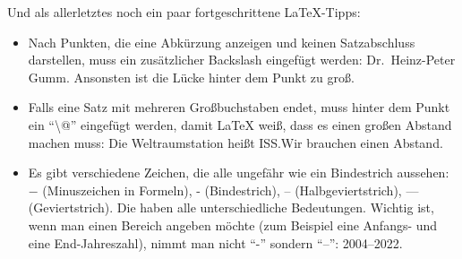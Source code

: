 \documentclass{dsadokumentation}
\begin{document}
Und als allerletztes noch ein paar fortgeschrittene \LaTeX{}-Tipps:
\begin{itemize}
	\item Nach Punkten, die eine Abkürzung anzeigen und keinen Satzabschluss darstellen, muss ein zusätzlicher Backslash eingefügt werden: Dr.\ Heinz-Peter Gumm. Ansonsten ist die Lücke hinter dem Punkt zu groß.
	\item Falls eine Satz mit mehreren Großbuchstaben endet, muss hinter dem Punkt ein \enquote{\textbackslash @} eingefügt werden, damit \LaTeX{} weiß, dass es einen großen Abstand machen muss: Die Weltraumstation heißt ISS.\@ Wir brauchen einen Abstand.
	\item Es gibt verschiedene Zeichen, die alle ungefähr wie ein Bindestrich aussehen: $-$ (Minuszeichen in Formeln), - (Bindestrich), -- (Halbgeviertstrich), --- (Geviertstrich). Die haben alle unterschiedliche Bedeutungen. Wichtig ist, wenn man einen Bereich angeben möchte (zum Beispiel eine Anfangs- und eine End-Jahreszahl), nimmt man nicht \enquote{-} sondern \enquote{--}: 2004--2022.
\end{itemize}

\printbibliography{}
\end{document}
